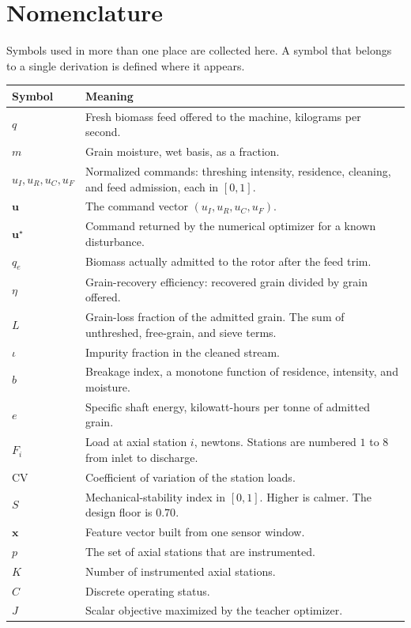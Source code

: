 \documentclass[12pt,a4paper]{report}
\begin{document}
\tableofcontents
\newpage

\chapter*{Nomenclature}

Symbols used in more than one place are collected here. A symbol that belongs to a single derivation is defined where it appears.

\begin{longtable}{@{}p{}p{}@{}}
\toprule
Symbol & Meaning \\
\midrule
\endhead
\(q\) & Fresh biomass feed offered to the machine, kilograms per second. \\
\(m\) & Grain moisture, wet basis, as a fraction. \\
\(u_I,u_R,u_C,u_F\) & Normalized commands: threshing intensity, residence, cleaning, and feed admission, each in \([0,1]\). \\
\(\mathbf{u}\) & The command vector \((u_I,u_R,u_C,u_F)\). \\
\(\mathbf{u}^\star\) & Command returned by the numerical optimizer for a known disturbance. \\
\(q_e\) & Biomass actually admitted to the rotor after the feed trim. \\
\(\eta\) & Grain-recovery efficiency: recovered grain divided by grain offered. \\
\(L\) & Grain-loss fraction of the admitted grain. The sum of unthreshed, free-grain, and sieve terms. \\
\(\iota\) & Impurity fraction in the cleaned stream. \\
\(b\) & Breakage index, a monotone function of residence, intensity, and moisture. \\
\(e\) & Specific shaft energy, kilowatt-hours per tonne of admitted grain. \\
\(F_i\) & Load at axial station \(i\), newtons. Stations are numbered \(1\) to \(8\) from inlet to discharge. \\
\(\mathrm{CV}\) & Coefficient of variation of the station loads. \\
\(S\) & Mechanical-stability index in \([0,1]\). Higher is calmer. The design floor is \(0.70\). \\
\(\mathbf{x}\) & Feature vector built from one sensor window. \\
\(p\) & The set of axial stations that are instrumented. \\
\(K\) & Number of instrumented axial stations. \\
\(C\) & Discrete operating status. \\
\(J\) & Scalar objective maximized by the teacher optimizer. \\
\bottomrule
\end{longtable}





\end{document}
